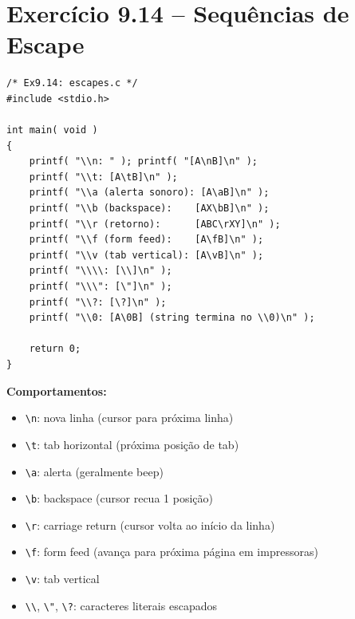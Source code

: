 \documentclass[12pt,a4paper]{article}
\begin{document}
\section{Exercício 9.14 -- Sequências de Escape}

\begin{respostabox}
\begin{lstlisting}
/* Ex9.14: escapes.c */
#include <stdio.h>

int main( void )
{
    printf( "\\n: " ); printf( "[A\nB]\n" );
    printf( "\\t: [A\tB]\n" );
    printf( "\\a (alerta sonoro): [A\aB]\n" );
    printf( "\\b (backspace):    [AX\bB]\n" );
    printf( "\\r (retorno):      [ABC\rXY]\n" );
    printf( "\\f (form feed):    [A\fB]\n" );
    printf( "\\v (tab vertical): [A\vB]\n" );
    printf( "\\\\: [\\]\n" );
    printf( "\\\": [\"]\n" );
    printf( "\\?: [\?]\n" );
    printf( "\\0: [A\0B] (string termina no \\0)\n" );

    return 0;
}
\end{lstlisting}

\textbf{Comportamentos:}
\begin{itemize}[noitemsep]
  \item \texttt{\textbackslash n}: nova linha (cursor para próxima linha)
  \item \texttt{\textbackslash t}: tab horizontal (próxima posição de tab)
  \item \texttt{\textbackslash a}: alerta (geralmente beep)
  \item \texttt{\textbackslash b}: backspace (cursor recua 1 posição)
  \item \texttt{\textbackslash r}: carriage return (cursor volta ao início da linha)
  \item \texttt{\textbackslash f}: form feed (avança para próxima página em impressoras)
  \item \texttt{\textbackslash v}: tab vertical
  \item \texttt{\textbackslash \textbackslash}, \texttt{\textbackslash "}, \texttt{\textbackslash ?}: caracteres literais escapados
\end{itemize}
\end{respostabox}
\end{document}
